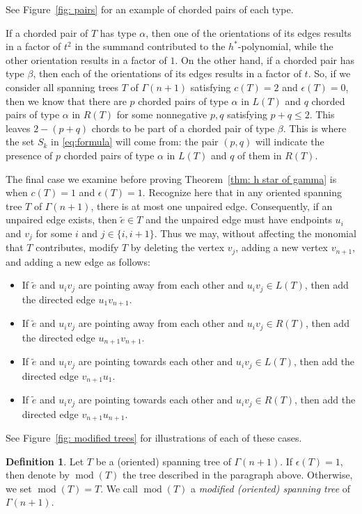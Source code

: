 \documentclass{amsart}
\numberwithin{equation}{section}
\theoremstyle{plain}
\theoremstyle{definition}
\newtheorem{defn}[thm]{Definition}
\DeclareMathOperator{\md}{mod}
\newcommand{\etilde}{\widetilde{e}}
\begin{document}
See Figure~\ref{fig: pairs} for an example of chorded pairs of each type.

If a chorded pair of $T$ has type $\alpha$, then one of the orientations of its edges results in a factor of $t^2$ in the summand contributed to the $h^*$-polynomial, while the other orientation results in a factor of $1$.
On the other hand, if a chorded pair has type $\beta$, then each of the orientations of its edges results in a factor of $t$.
So, if we consider all spanning trees $T$ of $\Gamma(n+1)$ satisfying $c(T) = 2$ and $\epsilon(T) = 0$, then we know that there are $p$ chorded pairs of type $\alpha$ in $L(T)$ and $q$ chorded pairs of type $\alpha$ in $R(T)$ for some nonnegative $p,q$ satisfying $p + q \leq 2$.
This leaves $2-(p+q)$ chords to be part of a chorded pair of type $\beta$.
This is where the set $S_k$ in \eqref{eq:formula} will come from: the pair $(p, q)$ will indicate the presence of $p$ chorded pairs of type $\alpha$ in $L(T)$ and $q$ of them in $R(T)$.

The final case we examine before proving Theorem~\ref{thm: h star of gamma} is when $c(T) = 1$ and $\epsilon(T) = 1$.
Recognize here that in any oriented spanning tree $T$ of $\Gamma(n+1)$, there is at most one unpaired edge.
Consequently, if an unpaired edge exists, then $\etilde \in T$ and the unpaired edge must have endpoints $u_i$ and $v_j$ for some $i$ and $j \in \{i,i+1\}$. 
Thus we may, without affecting the monomial that $T$ contributes, modify $T$ by deleting the vertex $v_j$, adding a new vertex $v_{n+1}$, and adding a new edge as follows:
\begin{itemize}
    \item If $\etilde$ and $u_iv_j$ are pointing away from each other and $u_iv_j \in L(T)$, then add the directed edge $u_1v_{n+1}$.
    \item If $\etilde$ and $u_iv_j$ are pointing away from each other and $u_iv_j \in R(T)$, then add the directed edge $u_{n+1}v_{n+1}$.
    \item If $\etilde$ and $u_iv_j$ are pointing towards each other and $u_iv_j \in L(T)$, then add the directed edge $v_{n+1}u_1$.
    \item If $\etilde$ and $u_iv_j$ are pointing towards each other and $u_iv_j \in R(T)$, then add the directed edge $v_{n+1}u_{n+1}$.
\end{itemize}
See Figure~\ref{fig: modified trees} for illustrations of each of these cases.

\begin{defn}
    Let $T$ be a (oriented) spanning tree of $\Gamma(n+1)$.
    If $\epsilon(T) = 1$, then denote by $\md(T)$ the tree described in the paragraph above.
    Otherwise, we set $\md(T) = T$.
    We call $\md(T)$ a \emph{modified (oriented) spanning tree} of $\Gamma(n+1)$.
\end{defn}
\end{document}
